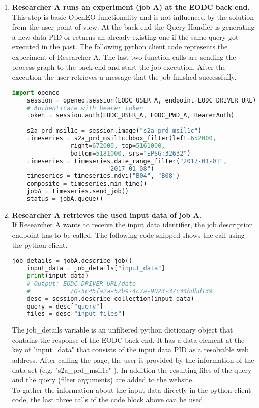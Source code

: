 \documentclass[draft,final]{vutinfth} %
\begin{document}
\begin{enumerate}
	\item \textbf{Researcher A runs an experiment (job A) at the EODC back end.} \\
	This step is basic OpenEO functionality and is not influenced by the solution from the user point of view. At the back end the Query Handler is generating a new data PID or returns an already existing one if the same query got executed in the past. The following python client code represents the experiment of Researcher A. The last two function calls are sending the process graph to the back end and start the job execution. After the execution the user retrieves a message that the job finished successfully.  
	\begin{lstlisting}[frame=single, language=Python]
	import openeo
	session = openeo.session(EODC_USER_A, endpoint=EODC_DRIVER_URL)
	# Authenticate with bearer token
	token = session.auth(EODC_USER_A, EODC_PWD_A, BearerAuth)
	
	s2a_prd_msil1c = session.image("s2a_prd_msil1c")
	timeseries = s2a_prd_msil1c.bbox_filter(left=652000, 
				right=672000, top=5161000,
				bottom=5181000, srs="EPSG:32632")
	timeseries = timeseries.date_range_filter("2017-01-01", 
						  "2017-01-08")
	timeseries = timeseries.ndvi("B04", "B08")
	composite = timeseries.min_time()
	jobA = timeseries.send_job()
	status = jobA.queue()
	\end{lstlisting}
	
	\item \textbf{Researcher A retrieves the used input data of job A.} \\
	If Researcher A wants to receive the input data identifier, the job description endpoint has to be called. The following code snipped shows the call using the python client.
	
	\begin{lstlisting}[frame=single, language=Python]
	job_details = jobA.describe_job()
	input_data = job_details["input_data"]
	print(input_data)
	# Output: EODC_DRIVER_URL/data
	#			/Q-5c45fa2a-52b9-4c7a-9023-37c34bdbd139
	desc = session.describe_collection(input_data)
	query = desc["query"]
	files = desc["input_files"]
	\end{lstlisting}
	
	The job\_details variable is an unfiltered python dictionary object that contains the response of the EODC back end. It has a data element at the key of "input\_data" that consists of the input data PID as a resolvable web address. After calling the page, the user is provided by the information of the data set (e.g. "s2a\_prd\_msil1c" ). In addition the resulting files of the query and the query (filter arguments) are added to the website. \\
	To gather the information about the input data directly in the python client code, the last three calls of the code block above can be used.    
	

\end{enumerate}
\end{document}
